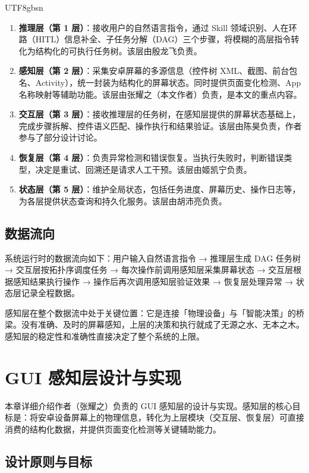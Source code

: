 \documentclass{article}
\begin{document}
\begin{CJK}{UTF8}{gbsn}
\begin{enumerate}[leftmargin=1.5em]
  \item \textbf{推理层（第 1 层）}：接收用户的自然语言指令，通过 Skill 领域识别、人在环路（HITL）信息补全、子任务分解（DAG）三个步骤，将模糊的高层指令转化为结构化的可执行任务树。该层由殷龙飞负责。
  \item \textbf{感知层（第 2 层）}：采集安卓屏幕的多源信息（控件树 XML、截图、前台包名、Activity），统一封装为结构化的屏幕状态。同时提供页面变化检测、App 名称映射等辅助功能。该层由张耀之（本文作者）负责，是本文的重点内容。
  \item \textbf{交互层（第 3 层）}：接收推理层的任务树，在感知层提供的屏幕状态基础上，完成步骤拆解、控件语义匹配、操作执行和结果验证。该层由陈昊负责，作者参与了部分设计讨论。
  \item \textbf{恢复层（第 4 层）}：负责异常检测和错误恢复。当执行失败时，判断错误类型，决定是重试、回溯还是请求人工干预。该层由姬凯宁负责。
  \item \textbf{状态层（第 5 层）}：维护全局状态，包括任务进度、屏幕历史、操作日志等，为各层提供状态查询和持久化服务。该层由胡沛亮负责。
\end{enumerate}

\subsection{数据流向}

系统运行时的数据流向如下：用户输入自然语言指令 → 推理层生成 DAG 任务树 → 交互层按拓扑序调度任务 → 每次操作前调用感知层采集屏幕状态 → 交互层根据感知结果执行操作 → 操作后再次调用感知层验证效果 → 恢复层处理异常 → 状态层记录全程数据。

感知层在整个数据流中处于关键位置：它是连接「物理设备」与「智能决策」的桥梁。没有准确、及时的屏幕感知，上层的决策和执行就成了无源之水、无本之木。感知层的稳定性和准确性直接决定了整个系统的上限。

\section{GUI 感知层设计与实现}
\label{sec:sensor_layer}

本章详细介绍作者（张耀之）负责的 GUI 感知层的设计与实现。感知层的核心目标是：将安卓设备屏幕上的物理信息，转化为上层模块（交互层、恢复层）可直接消费的结构化数据，并提供页面变化检测等关键辅助能力。

\subsection{设计原则与目标}


\end{CJK}
\end{document}
